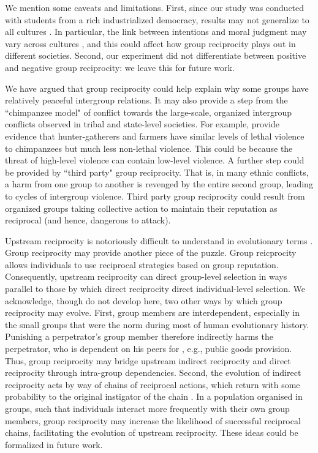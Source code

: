 \documentclass[12pt,a4paper]{article}\usepackage[]{graphicx}\usepackage[]{color}
\begin{document}
We mention some caveats and limitations.
First, since our study was conducted with students from a rich industrialized democracy, results may not generalize to all cultures \citep{henrich2010most}. In particular, the link between intentions and moral judgment may vary across cultures \citep{barrett2016small}, and this could affect how group reciprocity plays out in different societies. Second, our experiment did not differentiate between positive and
negative group reciprocity: we leave this for future work. 


We have argued that group reciprocity could help explain why some groups have relatively peaceful intergroup relations. It may
also provide a step from the ``chimpanzee model" of conflict towards the large-scale, organized intergroup conflicts
observed in tribal and state-level societies. For example, \citet{wrangham2006comparative} provide evidence that hunter-gatherers 
and farmers have similar
levels of lethal violence to chimpanzees but much less non-lethal violence. This could be because the threat of 
high-level violence
can contain low-level violence. A further step could be provided by ``third party" group reciprocity. That 
is, in many ethnic conflicts, a harm from one group to another is revenged by the entire second group, leading to 
cycles of intergroup violence. Third party group reciprocity could result from organized groups taking collective
action to maintain their reputation as reciprocal (and hence, dangerous to attack).

Upstream reciprocity is notoriously difficult to understand in evolutionary
terms \citep{boyd1989evolution,nowak2007upstream}. Group reciprocity may provide another piece of 
the puzzle. Group reicprocity allows individuals to use reciprocal strategies based on group 
reputation. Consequently, upstream reciprocity can direct group-level selection in ways parallel 
to those by which direct reciprocity direct individual-level selection.
We acknowledge, though do not develop here, two other ways by which group reciprocity may evolve.
First, group members are interdependent, especially in the small groups that were the norm during most of human evolutionary 
history. Punishing a perpetrator's group member therefore indirectly harms the perpetrator, who is dependent on his peers for
, e.g., public goods provision. Thus, group reciprocity may bridge upstream indirect reciprocity and direct reciprocity 
through intra-group dependencies. Second, the evolution of indirect reciprocity acts by way of chains
of reciprocal actions, which return with some probability to the original
instigator of the chain \citep{nowak2007upstream}. In a population
organised in groups, such that individuals interact more frequently with
their own group members, group reciprocity may increase the likelihood
of successful reciprocal chains, facilitating the evolution of upstream
reciprocity. These ideas could be formalized in future work.
\end{document}
